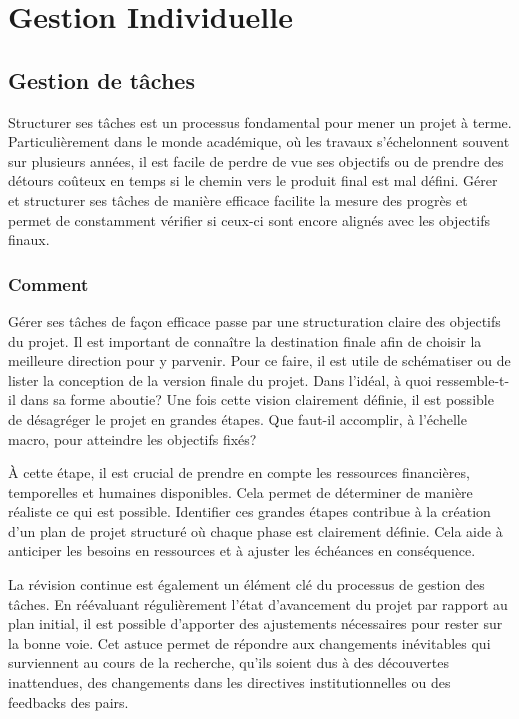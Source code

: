 \documentclass[
  letterpaper,
  DIV=11,
  numbers=noendperiod]{scrreprt}
\begin{document}
\section{Gestion Individuelle}\label{gestion-individuelle}

\subsection{Gestion de tâches}\label{gestion-de-tuxe2ches}

Structurer ses tâches est un processus fondamental pour mener un projet
à terme. Particulièrement dans le monde académique, où les travaux
s'échelonnent souvent sur plusieurs années, il est facile de perdre de
vue ses objectifs ou de prendre des détours coûteux en temps si le
chemin vers le produit final est mal défini. Gérer et structurer ses
tâches de manière efficace facilite la mesure des progrès et permet de
constamment vérifier si ceux-ci sont encore alignés avec les objectifs
finaux.

\subsubsection{Comment}\label{comment}

Gérer ses tâches de façon efficace passe par une structuration claire
des objectifs du projet. Il est important de connaître la destination
finale afin de choisir la meilleure direction pour y parvenir. Pour ce
faire, il est utile de schématiser ou de lister la conception de la
version finale du projet. Dans l'idéal, à quoi ressemble-t-il dans sa
forme aboutie? Une fois cette vision clairement définie, il est possible
de désagréger le projet en grandes étapes. Que faut-il accomplir, à
l'échelle macro, pour atteindre les objectifs fixés?

À cette étape, il est crucial de prendre en compte les ressources
financières, temporelles et humaines disponibles. Cela permet de
déterminer de manière réaliste ce qui est possible. Identifier ces
grandes étapes contribue à la création d'un plan de projet structuré où
chaque phase est clairement définie. Cela aide à anticiper les besoins
en ressources et à ajuster les échéances en conséquence.

La révision continue est également un élément clé du processus de
gestion des tâches. En réévaluant régulièrement l'état d'avancement du
projet par rapport au plan initial, il est possible d'apporter des
ajustements nécessaires pour rester sur la bonne voie. Cet astuce permet
de répondre aux changements inévitables qui surviennent au cours de la
recherche, qu'ils soient dus à des découvertes inattendues, des
changements dans les directives institutionnelles ou des feedbacks des
pairs.
\end{document}

